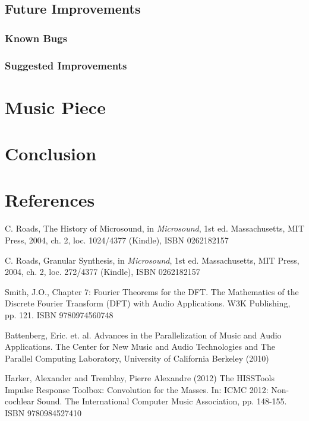 \documentclass{article}
\begin{document}
		


		\subsection{Future Improvements}
			\subsubsection{Known Bugs}
			\subsubsection{Suggested Improvements}
	\section{Music Piece}
	\section{Conclusion}
	\section{References}
		\begin{thebibliography}{99}
		 C. Roads, The History of Microsound, in \emph{Microsound}, 1st ed. Massachusetts, MIT Press, 2004, ch. 2, loc. 1024/4377 (Kindle), ISBN 0262182157

		 C. Roads, Granular Synthesis, in \emph{Microsound}, 1st ed. Massachusetts, MIT Press, 2004, ch. 2, loc. 272/4377 (Kindle), ISBN 0262182157

		 Smith, J.O., Chapter 7: Fourier Theorems for the DFT. The Mathematics of the Discrete Fourier Transform (DFT) with Audio Applications. W3K Publishing, pp. 121. ISBN 9780974560748

		 Battenberg, Eric. et. al. Advances in the Parallelization of Music and Audio Applications. The Center for New Music and Audio Technologies and The Parallel Computing Laboratory, University of California Berkeley (2010)

		 Harker, Alexander and Tremblay, Pierre Alexandre (2012) The HISSTools Impulse Response Toolbox: Convolution for the Masses. In: ICMC 2012: Non-cochlear Sound. The International Computer Music Association, pp. 148-155. ISBN 9780984527410
		\end{thebibliography}
\end{document}

